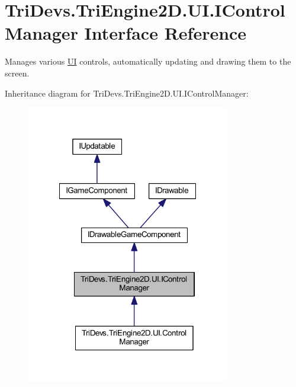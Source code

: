 \hypertarget{interface_tri_devs_1_1_tri_engine2_d_1_1_u_i_1_1_i_control_manager}{\section{Tri\-Devs.\-Tri\-Engine2\-D.\-U\-I.\-I\-Control\-Manager Interface Reference}
\label{interface_tri_devs_1_1_tri_engine2_d_1_1_u_i_1_1_i_control_manager}
}


Manages various \hyperlink{namespace_tri_devs_1_1_tri_engine2_d_1_1_u_i}{U\-I} controls, automatically updating and drawing them to the screen.  




Inheritance diagram for Tri\-Devs.\-Tri\-Engine2\-D.\-U\-I.\-I\-Control\-Manager\-:\nopagebreak
\begin{figure}[H]
\begin{center}
\leavevmode
\includegraphics[width=251pt]{interface_tri_devs_1_1_tri_engine2_d_1_1_u_i_1_1_i_control_manager__inherit__graph}
\end{center}
\end{figure}


